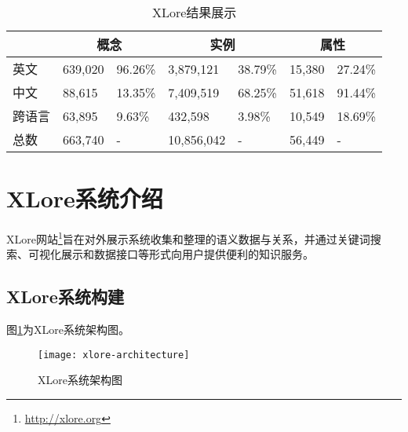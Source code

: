 \begin{table}[htb]
    \centering
  \begin{minipage}[t]{0.9\linewidth}
    \caption{XLore结果展示}
    \label{tab:xlore-result}
    \begin{tabularx}{\linewidth}{lXXXXXX}
        \toprule[1.5pt]
        \multicolumn{1}{c}{} & \multicolumn{2}{c}{概念}     & \multicolumn{2}{c}{实例}                   & \multicolumn{2}{c}{属性}    \\ \midrule[1pt]
英文            & 639,020 & 96.26\%          & 3,879,121   & 38.79\%                & 15,380  & 27.24\%                \\
中文            & 88,615  & 13.35\%          & 7,409,519   & 68.25\%                & 51,618  & 91.44\%                \\
跨语言          & 63,895  & 9.63\%           & 432,598     & 3.98\%                 & 10,549  & 18.69\%                \\
总数           & 663,740 & {-}               & 10,856,042  & {-}                    & 56,449  & {-} \\
      \bottomrule[1.5pt]
    \end{tabularx}
  \end{minipage}
\end{table}

\section{XLore系统介绍}
\label{sec5:system-describe}
XLore网站\footnote{\url{http://xlore.org}}旨在对外展示系统收集和整理的语义数据与关系，并通过关键词搜索、可视化展示和数据接口等形式向用户提供便利的知识服务。

\subsection{XLore系统构建}
图\ref{fig:xlore-architecture}为XLore系统架构图。

\begin{figure}[ht]
  \centering
  \texttt{[image: xlore-architecture]}
  \caption{XLore系统架构图}
  \label{fig:xlore-architecture}
\end{figure}

